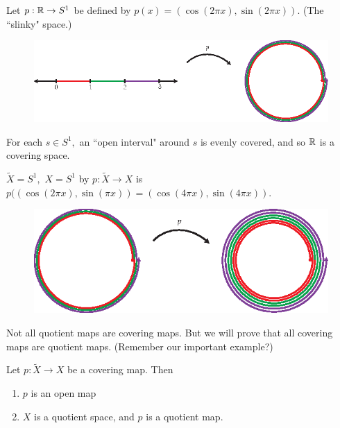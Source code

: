 \begin{example}[Important] Let $p:\mathbb R \rightarrow S^1$ be defined by $p(x)=(\cos(2 \pi x), \sin(2 \pi x))$.  (The ``slinky" space.)

\begin{figure}[ht!]
    \centering
    \includegraphics[width=330pt]{images/covering_spaces/slinky}
\end{figure}

For each $s \in S^1,$ an ``open interval" around $s$ is evenly covered, and so $\mathbb R$ is a covering space.  
\end{example}

\begin{example}
$\tilde{X}=S^1,$ $X=S^1$ by $p:\tilde{X} \rightarrow X$ is $p((\cos(2 \pi x), \sin(\pi x))=(\cos(4 \pi x), \sin(4 \pi x)).$  

\begin{figure}[ht!]
    \centering
    \includegraphics[width=330pt]{images/covering_spaces/s1_to_s1}
\end{figure}
\end{example}

Not all quotient maps are covering maps.  But we will prove that all covering maps are quotient maps.  (Remember our important example?)

\begin{theorem}  Let $p:\tilde{X}\rightarrow X$ be a covering map.  Then
\begin{enumerate}
\item  $p$ is an open map
\item $X$ is a quotient space, and $p$ is a quotient map.
\end{enumerate}
\end{theorem}


